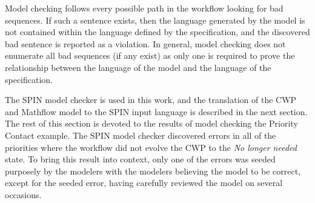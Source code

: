 Model checking follows every possible path in the workflow looking for bad sequences. If such a sentence exists, then the language generated by the model is not contained within the language defined by the specification, and the discovered bad sentence is reported as a violation. In general, model checking does not enumerate all bad sequences (if any exist) as only one is required to prove the relationship between the language of the model and the language of the specification. 

The SPIN model checker is used in this work, and the translation of the CWP and Mathflow model to the SPIN input language is described in the next section. The rest of this section is devoted to the results of model checking the Priority Contact example. The SPIN model checker discovered errors in all of the priorities where the workflow did not evolve the CWP to the \emph{No longer needed} state. To bring this result into context, only one of the errors was seeded purposely by the modelers with the modelers believing the model to be correct, except for the seeded error, having carefully reviewed the model on several occasions.

